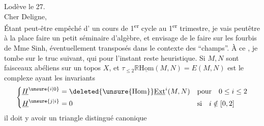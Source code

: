 
\noindent\hfill Lodève le 27.\\
Cher Deligne,\\
Étant peut-être empêché   d' un cours de 1\textsuperscript{er} cycle au 1\textsuperscript{er} trimestre, je vais peutêtre à la place faire un petit séminaire d'algèbre, et envisage de le faire sur les fourbis de Mme Sinh, éventuellement transposés dans le contexte des ``champs''. À ce , je tombe sur le truc suivant, qui pour l'instant reste heuristique. Si $M,N$ sont  faisceaux abéliens sur un topos $X$, et $\tau_{\leq 2}\mathbb{R}\underline{\mathrm{Hom}}(M,N)=E(M,N)$ est le complexe ayant les invariants
\[
\left\{\begin{aligned}
\underline{H}^{\unsure{i|0}} &= \deleted{\unsure{\mathrm{Hom}}}\underline{\mathrm{Ext}}^{i}(M,N) && \text{pour}\quad 0\leq i\leq 2\\
\underline{H}^{\unsure{j|i}} &= 0 && \text{si}\quad i\notin[0,2]
\end{aligned}\right.
\]
il doit y avoir un triangle distingué canonique

